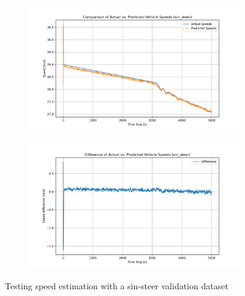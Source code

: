 \begin{figure}[htbp]
    \centering

    \begin{subfigure}{1\textwidth}
        \centering
        \includegraphics[width=\linewidth]{images/RNN_results/model_0_sin_steer_act_vs_predicted_speed.png}
    \end{subfigure}
    \hfill
    \begin{subfigure}{1\textwidth}
        \centering
        \includegraphics[width=\linewidth]{images/RNN_results/model_0_sin_steer_act_vs_predicted_speed_diff.png}
    \end{subfigure}
    
    \caption{Testing speed estimation with a sin-steer validation dataset}
    \label{fig:rnn_results_sin_steer}
\end{figure}

